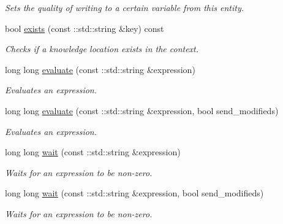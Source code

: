 \begin{DoxyCompactItemize}
\begin{DoxyCompactList}\small\item\em Sets the quality of writing to a certain variable from this entity. \item\end{DoxyCompactList}\item 
bool \hyperlink{classMadara_1_1Knowledge__Engine_1_1Knowledge__Base_ab53b823cf528ed14903a45e2d671914c}{exists} (const ::std::string \&key) const 
\begin{DoxyCompactList}\small\item\em Checks if a knowledge location exists in the context. \item\end{DoxyCompactList}\item 
long long \hyperlink{classMadara_1_1Knowledge__Engine_1_1Knowledge__Base_a9b25b30c34a63a8b33fb285c9ce54a77}{evaluate} (const ::std::string \&expression)
\begin{DoxyCompactList}\small\item\em Evaluates an expression. \item\end{DoxyCompactList}\item 
long long \hyperlink{classMadara_1_1Knowledge__Engine_1_1Knowledge__Base_ac3623a17b6adcb34a821df7a8b97407e}{evaluate} (const ::std::string \&expression, bool send\_\-modifieds)
\begin{DoxyCompactList}\small\item\em Evaluates an expression. \item\end{DoxyCompactList}\item 
long long \hyperlink{classMadara_1_1Knowledge__Engine_1_1Knowledge__Base_a754181d491b72b052d9f92a6052e8f17}{wait} (const ::std::string \&expression)
\begin{DoxyCompactList}\small\item\em Waits for an expression to be non-\/zero. \item\end{DoxyCompactList}\item 
long long \hyperlink{classMadara_1_1Knowledge__Engine_1_1Knowledge__Base_ab227d9ce466aa954032d065700ae498f}{wait} (const ::std::string \&expression, bool send\_\-modifieds)
\begin{DoxyCompactList}\small\item\em Waits for an expression to be non-\/zero. \item\end{DoxyCompactList}\item 

\end{DoxyCompactItemize}
